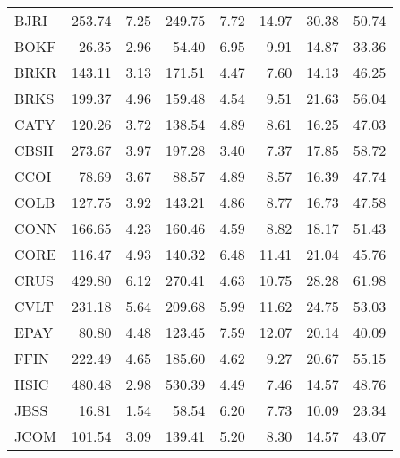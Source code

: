 \begin{table}
\begin{tabular}{lrrrrrrr}
  BJRI &       253.74 &          7.25 &          249.75 &             7.72 &         14.97 &      30.38 &        50.74 \\
  BOKF &        26.35 &          2.96 &           54.40 &             6.95 &          9.91 &      14.87 &        33.36 \\
  BRKR &       143.11 &          3.13 &          171.51 &             4.47 &          7.60 &      14.13 &        46.25 \\
  BRKS &       199.37 &          4.96 &          159.48 &             4.54 &          9.51 &      21.63 &        56.04 \\
  CATY &       120.26 &          3.72 &          138.54 &             4.89 &          8.61 &      16.25 &        47.03 \\
  CBSH &       273.67 &          3.97 &          197.28 &             3.40 &          7.37 &      17.85 &        58.72 \\
  CCOI &        78.69 &          3.67 &           88.57 &             4.89 &          8.57 &      16.39 &        47.74 \\
  COLB &       127.75 &          3.92 &          143.21 &             4.86 &          8.77 &      16.73 &        47.58 \\
  CONN &       166.65 &          4.23 &          160.46 &             4.59 &          8.82 &      18.17 &        51.43 \\
  CORE &       116.47 &          4.93 &          140.32 &             6.48 &         11.41 &      21.04 &        45.76 \\
  CRUS &       429.80 &          6.12 &          270.41 &             4.63 &         10.75 &      28.28 &        61.98 \\
  CVLT &       231.18 &          5.64 &          209.68 &             5.99 &         11.62 &      24.75 &        53.03 \\
  EPAY &        80.80 &          4.48 &          123.45 &             7.59 &         12.07 &      20.14 &        40.09 \\
  FFIN &       222.49 &          4.65 &          185.60 &             4.62 &          9.27 &      20.67 &        55.15 \\
  HSIC &       480.48 &          2.98 &          530.39 &             4.49 &          7.46 &      14.57 &        48.76 \\
  JBSS &        16.81 &          1.54 &           58.54 &             6.20 &          7.73 &      10.09 &        23.34 \\
  JCOM &       101.54 &          3.09 &          139.41 &             5.20 &          8.30 &      14.57 &        43.07 \\

\end{tabular}
\end{table}
